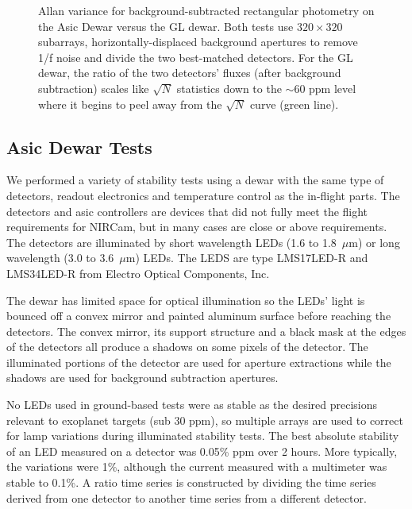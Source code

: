 \documentclass{aastex62}
\begin{document}
\begin{figure}
\caption{Allan variance for background-subtracted rectangular photometry on the Asic Dewar versus the GL dewar.
Both tests use $320 \times 320$ subarrays, horizontally-displaced background apertures to remove 1/f noise and divide the two best-matched detectors.
For the GL dewar, the ratio of the two detectors' fluxes (after background subtraction) scales like $\sqrt{N}$ statistics down to the $\sim$60 ppm level where it begins to peel away from the $\sqrt{N}$ curve (green line).}\label{fig:GLAllanVarianceAcrossDetectorsSub6}
\end{figure}

\clearpage
\subsection{Asic Dewar Tests}
We performed a variety of stability tests using a dewar with the same type of detectors, readout electronics and temperature control as the in-flight parts.
The detectors and asic controllers are devices that did not fully meet the flight requirements for NIRCam, but in many cases are close or above requirements.
The detectors are illuminated by short wavelength LEDs (1.6 to 1.8~$\mu$m) or long wavelength (3.0 to 3.6~$\mu$m) LEDs.
The LEDS are type LMS17LED-R and LMS34LED-R from Electro Optical Components, Inc.

The dewar has limited space for optical illumination so the LEDs' light is bounced off a convex mirror and painted aluminum surface before reaching the detectors.
The convex mirror, its support structure and a black mask at the edges of the detectors all produce a shadows on some pixels of the detector.
The illuminated portions of the detector are used for aperture extractions while the shadows are used for background subtraction apertures.

No LEDs used in ground-based tests were as stable as the desired precisions relevant to exoplanet targets (sub 30 ppm), so multiple arrays are used to correct for lamp variations during illuminated stability tests.
The best absolute stability of an LED measured on a detector was 0.05\% ppm over 2 hours.
More typically, the variations were 1\%, although the current measured with a multimeter was stable to 0.1\%.
A ratio time series is constructed by dividing the time series derived from one detector to another time series from a different detector.
\end{document}
